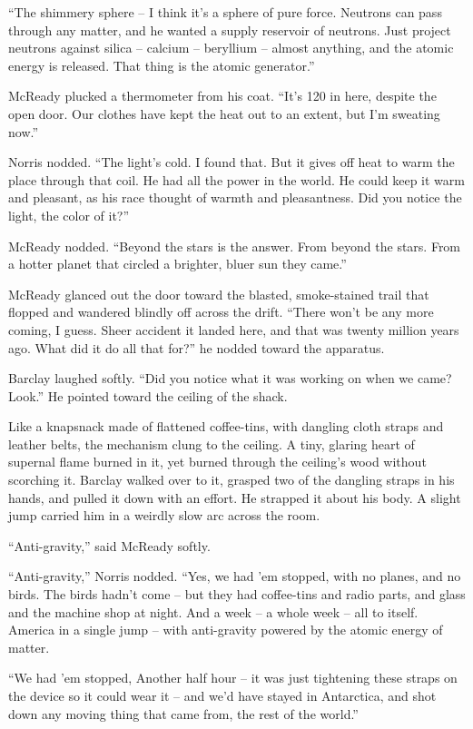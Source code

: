 \documentclass[letterpaper,openany,12pt]{memoir}		%
\begin{document}
``The shimmery sphere -- I think it's a sphere of pure force. Neutrons can pass
through any matter, and he wanted a supply reservoir of neutrons. Just project
neutrons against silica -- calcium -- beryllium -- almost anything, and the
atomic energy is released. That thing is the atomic generator.''

McReady plucked a thermometer from his coat. ``It's 120 in here, despite the
open door. Our clothes have kept the heat out to an extent, but I'm sweating
now.''

Norris nodded. ``The light's cold. I found that. But it gives off heat to warm
the place through that coil. He had all the power in the world. He could keep it
warm and pleasant, as his race thought of warmth and pleasantness. Did you
notice the light, the color of it?''

McReady nodded. ``Beyond the stars is the answer. From beyond the stars. From a
hotter planet that circled a brighter, bluer sun they came.''

McReady glanced out the door toward the blasted, smoke-stained trail that
flopped and wandered blindly off across the drift. ``There won't be any more
coming, I guess. Sheer accident it landed here, and that was twenty million
years ago. What did it do all that for?'' he nodded toward the apparatus.

Barclay laughed softly. ``Did you notice what it was working on when we came?
Look.'' He pointed toward the ceiling of the shack.

Like a knapsnack made of flattened coffee-tins, with dangling cloth straps and
leather belts, the mechanism clung to the ceiling. A tiny, glaring heart of
supernal flame burned in it, yet burned through the ceiling's wood without
scorching it. Barclay walked over to it, grasped two of the dangling straps in
his hands, and pulled it down with an effort. He strapped it about his body. A
slight jump carried him in a weirdly slow arc across the room.

``Anti-gravity,'' said McReady softly.

``Anti-gravity,'' Norris nodded. ``Yes, we had 'em stopped, with no planes, and
no birds. The birds hadn't come -- but they had coffee-tins and radio parts, and
glass and the machine shop at night. And a week -- a whole week -- all to
itself. America in a single jump -- with anti-gravity powered by the atomic
energy of matter.

``We had 'em stopped, Another half hour -- it was just tightening these straps
on the device so it could wear it -- and we'd have stayed in Antarctica, and
shot down any moving thing that came from, the rest of the world.''
\end{document}
